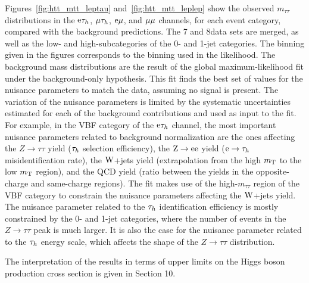 \documentclass[11pt,twoside,a4paper,cmspaper,final,collab]{cms-tdr}
\begin{document}
Figures~\ref{fig:htt_mtt_leptau} and~\ref{fig:htt_mtt_leplep} show the observed  $m_{\tau\tau}$ distributions in the $\mathrm{e}\tau_h$, ${\mu}\tau_h$, $\mathrm{e}{\mu}$, and ${\mu}{\mu}$ channels, for each event category, compared with the background predictions.
The  7 and 8\TeV data sets are merged, as well as the low- and high-\PT subcategories of the 0- and 1-jet categories.
The binning given in the figures corresponds to the binning used in the likelihood.
The background mass distributions are the result of the global maximum-likelihood fit under the background-only hypothesis.
This fit finds the best set of values for the nuisance parameters to match the data,
assuming no signal is present.
The variation of the nuisance parameters is limited by the systematic uncertainties estimated for each of the background contributions and used as input to the fit.
For example, in the VBF category of the $\mathrm{e}\tau_h$ channel,
the most important nuisance parameters related to background normalization are the ones affecting
the $Z\to \tau \tau$ yield ($\tau_h$ selection efficiency),
the $\mathrm{Z}\to \mathrm{e}\mathrm{e}$ yield ($\mathrm{e} \to \tau_h$ misidentification rate),
the $\mathrm{W}$+jets yield (extrapolation from the high $m_\mathrm{T}$ to the low $m_\mathrm{T}$ region),
and the QCD yield (ratio between the yields in the opposite-charge and same-charge regions).
The fit makes use of the high-$m_{\tau\tau}$ region of the VBF category to constrain the nuisance parameters affecting the $\mathrm{W}$+jets yield.
The nuisance parameter related to the $\tau_h$ identification efficiency is mostly constrained by the 0- and 1-jet categories,
where the number of events in the $Z\to \tau\tau$ peak is much larger.
It is also the case for the nuisance parameter related to the $\tau_h$ energy scale, which affects the shape of the $Z\to \tau \tau$ distribution.

The interpretation of the results in terms of upper limits on the Higgs boson production cross section is given in Section 10.
\end{document}
